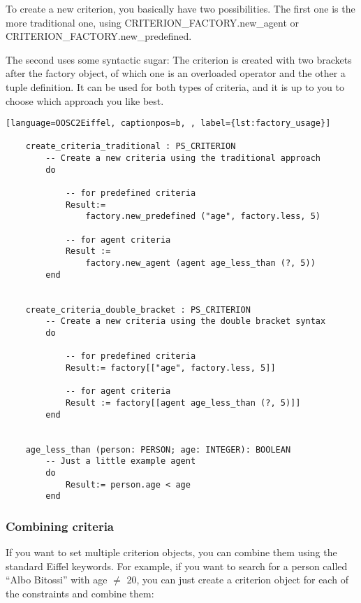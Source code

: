 To create a new criterion, you basically have two possibilities.
The first one is the more traditional one, using CRITERION\_FACTORY.new\_agent or CRITERION\_FACTORY.new\_predefined.

The second uses some syntactic sugar:
The criterion is created with two brackets after the factory object, of which one is an overloaded operator and the other a tuple definition.
It can be used for both types of criteria, and it is up to you to choose which approach you like best.

\begin{lstlisting}[language=OOSC2Eiffel, captionpos=b, , label={lst:factory_usage}]

	create_criteria_traditional : PS_CRITERION
		-- Create a new criteria using the traditional approach
		do

			-- for predefined criteria
			Result:= 
				factory.new_predefined ("age", factory.less, 5)

			-- for agent criteria
			Result := 
				factory.new_agent (agent age_less_than (?, 5))
		end


	create_criteria_double_bracket : PS_CRITERION
		-- Create a new criteria using the double bracket syntax
		do

			-- for predefined criteria
			Result:= factory[["age", factory.less, 5]]

			-- for agent criteria
			Result := factory[[agent age_less_than (?, 5)]]
		end			


	age_less_than (person: PERSON; age: INTEGER): BOOLEAN
		-- Just a little example agent
		do
			Result:= person.age < age
		end

\end{lstlisting}



\subsubsection{Combining criteria}

If you want to set multiple criterion objects, you can combine them using the standard Eiffel keywords. 
For example, if you want to search for a person called ``Albo Bitossi'' with age $\ne$ 20, you can just create a criterion object for each of the constraints and combine them:  

